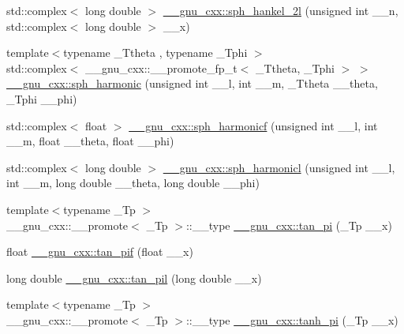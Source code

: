 \begin{DoxyCompactItemize}
\item 
std\+::complex$<$ long double $>$ \hyperlink{group__gnu__math__spec__func_ga3d9d9aaceba455a5ddc79d178ee1cb6d}{\+\_\+\+\_\+gnu\+\_\+cxx\+::sph\+\_\+hankel\+\_\+2l} (unsigned int \+\_\+\+\_\+n, std\+::complex$<$ long double $>$ \+\_\+\+\_\+x)
\item 
{\footnotesize template$<$typename \+\_\+\+Ttheta , typename \+\_\+\+Tphi $>$ }\\std\+::complex$<$ \+\_\+\+\_\+gnu\+\_\+cxx\+::\+\_\+\+\_\+promote\+\_\+fp\+\_\+t$<$ \+\_\+\+Ttheta, \+\_\+\+Tphi $>$ $>$ \hyperlink{group__gnu__math__spec__func_gadca3d25c4f7eed15099d8f80681d4055}{\+\_\+\+\_\+gnu\+\_\+cxx\+::sph\+\_\+harmonic} (unsigned int \+\_\+\+\_\+l, int \+\_\+\+\_\+m, \+\_\+\+Ttheta \+\_\+\+\_\+theta, \+\_\+\+Tphi \+\_\+\+\_\+phi)
\item 
std\+::complex$<$ float $>$ \hyperlink{group__gnu__math__spec__func_ga062b1156f5646fe42719439bb3dcc9e5}{\+\_\+\+\_\+gnu\+\_\+cxx\+::sph\+\_\+harmonicf} (unsigned int \+\_\+\+\_\+l, int \+\_\+\+\_\+m, float \+\_\+\+\_\+theta, float \+\_\+\+\_\+phi)
\item 
std\+::complex$<$ long double $>$ \hyperlink{group__gnu__math__spec__func_ga414c8374b4579aa14e38f5401304b6fa}{\+\_\+\+\_\+gnu\+\_\+cxx\+::sph\+\_\+harmonicl} (unsigned int \+\_\+\+\_\+l, int \+\_\+\+\_\+m, long double \+\_\+\+\_\+theta, long double \+\_\+\+\_\+phi)
\item 
{\footnotesize template$<$typename \+\_\+\+Tp $>$ }\\\+\_\+\+\_\+gnu\+\_\+cxx\+::\+\_\+\+\_\+promote$<$ \+\_\+\+Tp $>$\+::\+\_\+\+\_\+type \hyperlink{group__gnu__math__spec__func_gaaa0da4a6511e963be61a1e7f43348ff5}{\+\_\+\+\_\+gnu\+\_\+cxx\+::tan\+\_\+pi} (\+\_\+\+Tp \+\_\+\+\_\+x)
\item 
float \hyperlink{group__gnu__math__spec__func_gaab32e2d76da811451e84232320ddf80c}{\+\_\+\+\_\+gnu\+\_\+cxx\+::tan\+\_\+pif} (float \+\_\+\+\_\+x)
\item 
long double \hyperlink{group__gnu__math__spec__func_ga3546906a5bb8f128c893dddef72e2f20}{\+\_\+\+\_\+gnu\+\_\+cxx\+::tan\+\_\+pil} (long double \+\_\+\+\_\+x)
\item 
{\footnotesize template$<$typename \+\_\+\+Tp $>$ }\\\+\_\+\+\_\+gnu\+\_\+cxx\+::\+\_\+\+\_\+promote$<$ \+\_\+\+Tp $>$\+::\+\_\+\+\_\+type \hyperlink{group__gnu__math__spec__func_gae18891254bff63a37d11c8f15010fff4}{\+\_\+\+\_\+gnu\+\_\+cxx\+::tanh\+\_\+pi} (\+\_\+\+Tp \+\_\+\+\_\+x)
\item 

\end{DoxyCompactItemize}
